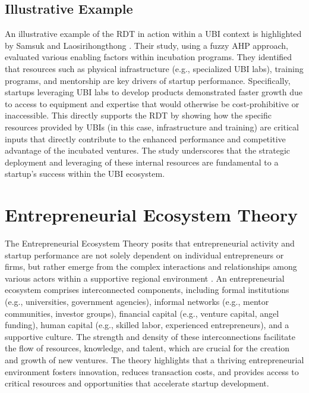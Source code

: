 \documentclass[../Main.tex]{subfiles}
\begin{document}
\subsection{Illustrative Example}
An illustrative example of the RDT in action within a UBI context is highlighted by Samsuk and Laosirihongthong \cite{samsuk2014fuzzy}. Their study, using a fuzzy AHP approach, evaluated various enabling factors within incubation programs. They identified that resources such as physical infrastructure (e.g., specialized UBI labs), training programs, and mentorship are key drivers of startup performance. Specifically, startups leveraging UBI labs to develop products demonstrated faster growth due to access to equipment and expertise that would otherwise be cost-prohibitive or inaccessible. This directly supports the RDT by showing how the specific resources provided by UBIs (in this case, infrastructure and training) are critical inputs that directly contribute to the enhanced performance and competitive advantage of the incubated ventures. The study underscores that the strategic deployment and leveraging of these internal resources are fundamental to a startup's success within the UBI ecosystem.


\section{Entrepreneurial Ecosystem Theory}

The Entrepreneurial Ecosystem Theory posits that entrepreneurial activity and startup performance are not solely dependent on individual entrepreneurs or firms, but rather emerge from the complex interactions and relationships among various actors within a supportive regional environment \cite{spigel2017relational}. An entrepreneurial ecosystem comprises interconnected components, including formal institutions (e.g., universities, government agencies), informal networks (e.g., mentor communities, investor groups), financial capital (e.g., venture capital, angel funding), human capital (e.g., skilled labor, experienced entrepreneurs), and a supportive culture. The strength and density of these interconnections facilitate the flow of resources, knowledge, and talent, which are crucial for the creation and growth of new ventures. The theory highlights that a thriving entrepreneurial environment fosters innovation, reduces transaction costs, and provides access to critical resources and opportunities that accelerate startup development.
\end{document}
